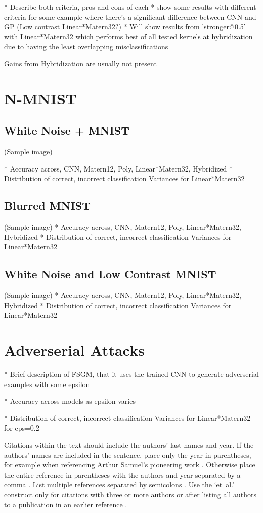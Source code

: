 \documentclass{article}
\begin{document}
* Describe both criteria, pros and cons of each
* show some results with different criteria for some example where there's a significant difference between CNN and GP (Low contrast Linear*Matern32?)
* Will show results from 'stronger@0.5' with Linear*Matern32 which performs best of all tested kernels at hybridization due to having the least overlapping misclassifications


Gains from Hybridization are usually not present

\section{N-MNIST}

\subsection{White Noise + MNIST}
 (Sample image) 
 
* Accuracy across, CNN, Matern12, Poly, Linear*Matern32, Hybridized
* Distribution of correct, incorrect classification Variances for Linear*Matern32

\subsection{Blurred MNIST}
 (Sample image)
* Accuracy across, CNN, Matern12, Poly, Linear*Matern32, Hybridized
* Distribution of correct, incorrect classification Variances for Linear*Matern32

\subsection{White Noise and Low Contrast MNIST}
 (Sample image)
* Accuracy across, CNN, Matern12, Poly, Linear*Matern32, Hybridized
* Distribution of correct, incorrect classification Variances for Linear*Matern32



\section{Adverserial Attacks}
* Brief description of FSGM, that it uses the trained CNN to generate adverserial examples with some epsilon

* Accuracy across models as epsilon varies

* Distribution of correct, incorrect classification Variances for Linear*Matern32 for eps=0.2


Citations within the text should include the authors' last names and
year. If the authors' names are included in the sentence, place only
the year in parentheses, for example when referencing Arthur Samuel's
pioneering work . Otherwise place the entire
reference in parentheses with the authors and year separated by a
comma \cite{Samuel59}. List multiple references separated by
semicolons \cite{kearns89,Samuel59,mitchell80}. Use the `et~al.'
construct only for citations with three or more authors or after
listing all authors to a publication in an earlier reference \cite{MachineLearningI}.
\end{document}
